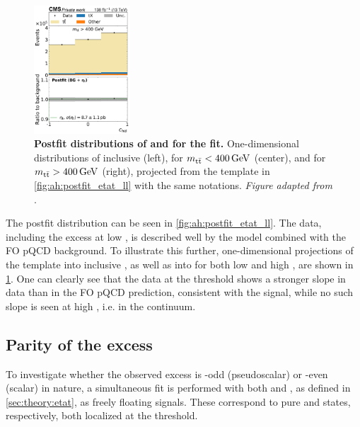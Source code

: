 \begin{figure}[p]
    \hfill
    \includegraphics[width=0.32\textwidth]{figures/ah/prepost/EtaT_fit_s_ll_run2_both_chel_mttgt400.pdf}
    \caption{
        \label{fig:ah:postfit_etat_1d}
        \textbf{Postfit distributions of \mtt and \chel for the \etat fit.} One-dimensional distributions of inclusive \mtt (left), \chel for $\mtt < \SI{400}{\GeV}$ (center), and \chel for $\mtt > \SI{400}{\GeV}$ (right), projected from the \mttchelchan template in \cref{fig:ah:postfit_etat_ll} with the same notations. \textit{Figure adapted from }.
    }
    
\end{figure}

The postfit \mttchelchan distribution can be seen in \cref{fig:ah:postfit_etat_ll}. The data, including the excess at low \mtt, is described well by the \etat model combined with the FO pQCD background. To illustrate this further, one-dimensional projections of the \mttchelchan template into inclusive \mtt, as well as into \chel for both low and high \mtt, are shown in \cref{fig:ah:postfit_etat_1d}. One can clearly see that the data at the \ttbar threshold shows a stronger slope in data than in the FO pQCD prediction, consistent with the \etat signal, while no such slope is seen at high \mtt, i.e. in the \ttbar continuum.


\subsection{Parity of the excess}
\label{sec:ah:parityscan}

To investigate whether the observed excess is \CP-odd (pseudoscalar) or \CP-even (scalar) in nature, a simultaneous fit is performed with both \etat and \chit, as defined in \cref{sec:theory:etat}, as freely floating signals. These correspond to pure  and  \ttbar states, respectively, both localized at the \ttbar threshold.

